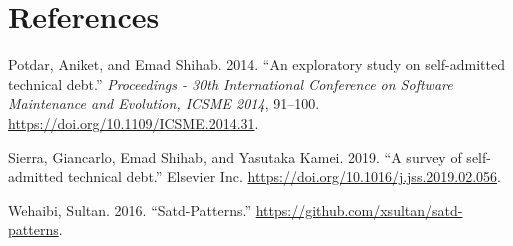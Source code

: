 \documentclass[
]{article}
\newlength{\cslhangindent}
\newenvironment{cslreferences}%
  {\setlength{\parindent}{0pt}%
  \everypar{\setlength{\hangindent}{\cslhangindent}}\ignorespaces}%
  {\par}
\begin{document}
\normalsize

\section{References}

\hypertarget{refs}{}
\begin{cslreferences}
\leavevmode\hypertarget{ref-Potdar2014}{}%
Potdar, Aniket, and Emad Shihab. 2014. ``An exploratory study on
self-admitted technical debt.'' \emph{Proceedings - 30th International
Conference on Software Maintenance and Evolution, ICSME 2014}, 91--100.
\url{https://doi.org/10.1109/ICSME.2014.31}.

\leavevmode\hypertarget{ref-Sierra2019}{}%
Sierra, Giancarlo, Emad Shihab, and Yasutaka Kamei. 2019. ``A survey of
self-admitted technical debt.'' Elsevier Inc.
\url{https://doi.org/10.1016/j.jss.2019.02.056}.

\leavevmode\hypertarget{ref-Wehaibi2016}{}%
Wehaibi, Sultan. 2016. ``Satd-Patterns.''
\url{https://github.com/xsultan/satd-patterns}.
\end{cslreferences}
\end{document}
